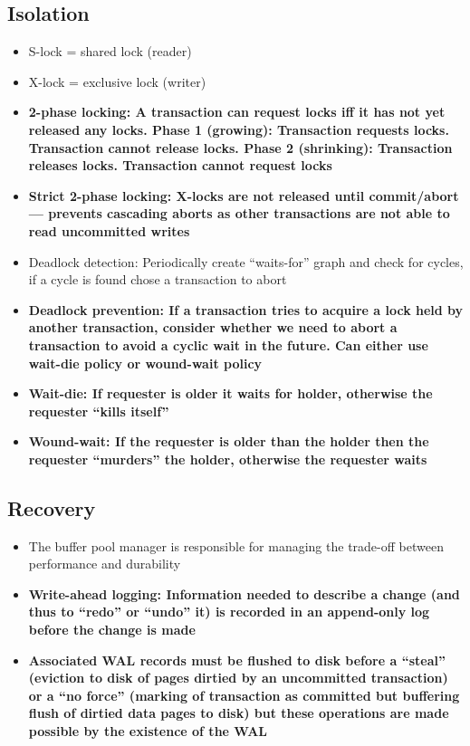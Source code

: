 \documentclass[20pt,a4paper,landscape]{extarticle}
\begin{document}
\begin{flushleft}
\subsection{Isolation}
\begin{itemize}
\item S-lock = shared lock (reader)
\item X-lock = exclusive lock (writer)
\item \textbf{2-phase locking: A transaction can request locks iff it has not yet released any locks. Phase 1 (growing): Transaction requests locks. Transaction cannot release locks. Phase 2 (shrinking): Transaction releases locks. Transaction cannot request locks}
\item \textbf{Strict 2-phase locking: X-locks are not released until commit/abort --- prevents cascading aborts as other transactions are not able to read uncommitted writes}
\item Deadlock detection: Periodically create “waits-for” graph and check for cycles, if a cycle is found chose a transaction to abort
\item \textbf{Deadlock prevention: If a transaction tries to acquire a lock held by another transaction, consider whether we need to abort a transaction to avoid a cyclic wait in the future. Can either use wait-die policy or wound-wait policy}
\item \textbf{Wait-die: If requester is older it waits for holder, otherwise the requester ``kills itself''}
\item \textbf{Wound-wait: If the requester is older than the holder then the requester ``murders'' the holder, otherwise the requester waits}
\end{itemize}
\subsection{Recovery}
\begin{itemize}
\item The buffer pool manager is responsible for managing the trade-off between performance and durability
\item \textbf{Write-ahead logging: Information needed to describe a change (and thus to ``redo'' or ``undo'' it) is recorded in an append-only log before the change is made}
\item \textbf{Associated WAL records must be flushed to disk before a ``steal'' (eviction to disk of pages dirtied by an uncommitted transaction) or a “no force” (marking of transaction as committed but buffering flush of dirtied data pages to disk) but these operations are made possible by the existence of the WAL}
\end{itemize}

\end{flushleft}
\end{document}
